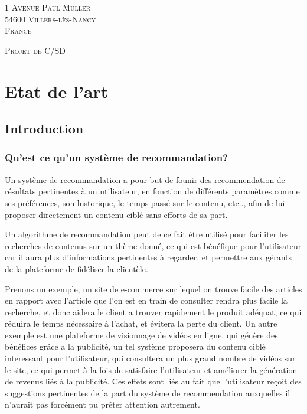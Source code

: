\documentclass{report}
\begin{document}
\begin{titlepage}
\begin{flushright}
        {\scshape
        1 Avenue Paul Muller\\
        54600 Villers-lès-Nancy\\
        France}
        \end{flushright}
        \vspace*{-1cm}
        \begin{flushleft}
        {\scshape Projet de C/SD}
        \end{flushleft}
\end{titlepage}

\newpage
\tableofcontents
\chapter{Etat de l'art}
\section{Introduction}
\subsection{Qu'est ce qu'un système de recommandation?}
Un système de recommandation a pour but de founir des recommendation de résultats pertinentes à un utilisateur, en fonction de différents paramètres comme ses préférences, son historique, le temps passé sur le contenu, etc.., afin de lui proposer directement un contenu ciblé sans efforts de sa part.

Un algorithme de recommandation peut de ce fait être utilisé pour faciliter les recherches de contenus sur un thème donné, ce qui est bénéfique pour l'utilisateur car il aura plus d'informations pertinentes à regarder, et permettre aux gérants de la plateforme de fidéliser la clientèle.\par

Prenons un exemple, un site de e-commerce sur lequel on trouve facile des articles en rapport avec l'article que l'on est en train de consulter rendra plus facile la recherche, et donc aidera le client a trouver rapidement le produit adéquat, ce qui réduira le temps nécessaire à l'achat, et évitera la perte du client.
Un autre exemple est une plateforme de visionnage de vidéos en ligne, qui génère des bénéfices grâce a la publicité, un tel système proposera du contenu ciblé interessant pour l'utilisateur, qui consultera un plus grand nombre de vidéos sur le site, ce qui permet à la fois de satisfaire l'utilisateur et améliorer la génération de revenus liés à la publicité.
Ces effets sont liés au fait que l'utilisateur reçoit des suggestions pertinentes de la part du système de recommendation auxquelles il n'aurait pas forcément pu prêter attention autrement.\par
\end{document}
